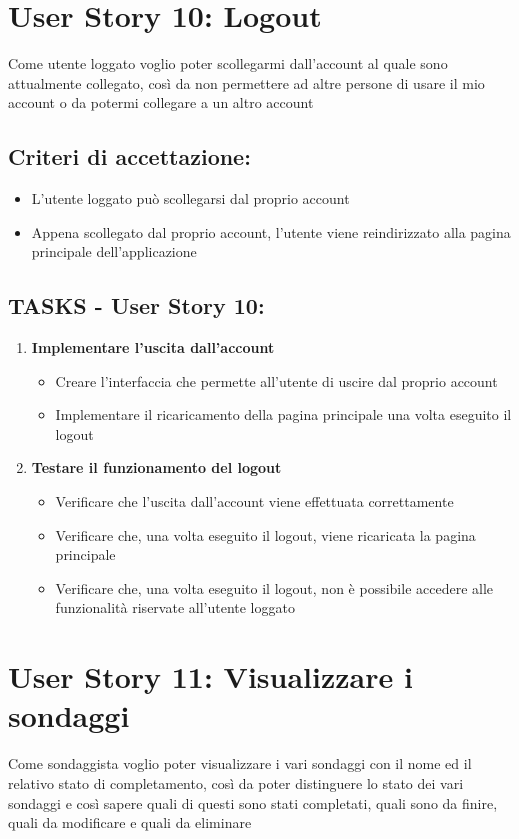\section*{User Story 10: Logout}
    Come utente loggato voglio poter scollegarmi dall'account al quale sono attualmente collegato, così da non permettere ad altre persone di usare il mio account o da potermi collegare a un altro account
    \subsection*{Criteri di accettazione:}  
    \begin{itemize}  
        \item L'utente loggato può scollegarsi dal proprio account
        \item Appena scollegato dal proprio account, l'utente viene reindirizzato alla pagina principale dell'applicazione
    \end{itemize}  
    \subsection*{TASKS - User Story 10:}  
    \begin{enumerate}  
        \item \textbf{Implementare l'uscita dall'account}  
            \begin{itemize}  
                \item Creare l'interfaccia che permette all'utente di uscire dal proprio account
                \item Implementare il ricaricamento della pagina principale una volta eseguito il logout
            \end{itemize}  
        \item \textbf{Testare il funzionamento del logout}  
            \begin{itemize}  
                \item Verificare che l'uscita dall'account viene effettuata correttamente
                \item Verificare che, una volta eseguito il logout, viene ricaricata la pagina principale
                \item Verificare che, una volta eseguito il logout, non è possibile accedere alle funzionalità riservate all'utente loggato
            \end{itemize} 
    \end{enumerate}
\section*{User Story 11: Visualizzare i sondaggi}
    Come sondaggista voglio poter visualizzare i vari sondaggi con il nome ed il relativo stato di completamento, così da poter distinguere lo stato dei vari sondaggi e così sapere quali di questi sono stati completati, quali sono da finire, quali da modificare e quali da eliminare
